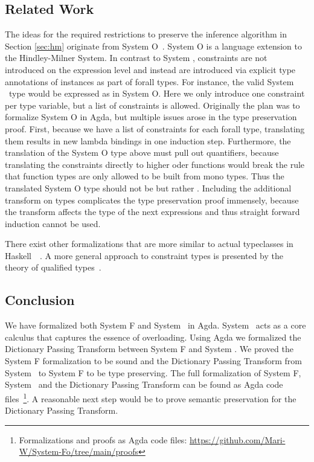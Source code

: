 \subsection{Related Work}
The ideas for the required restrictions to preserve the inference algorithm in Section \ref{sec:hm} originate from System O~\cite{syso}. 
System O is a language extension to the Hindley-Milner System. 
In contrast to System \Fo, constraints are not introduced on the expression level and instead are introduced via explicit type annotations of instances as part of forall types. 
For instance, the valid System \Fo\ type  would be expressed as  in System O. 
Here we only introduce one constraint per type variable, but a list of constraints is allowed. 
Originally the plan was to formalize System O in Agda, but multiple issues arose in the type preservation proof. 
First, because we have a list of  constraints for each forall type, translating them results in  new lambda bindings in one induction step. 
Furthermore, the translation of the System O type above must pull out quantifiers, because translating the constraints directly to higher oder functions would break the rule that function types are only allowed to be built from mono types. 
Thus the translated System O type should not be  but rather . Including the additional transform on types complicates the type preservation proof immensely, because the transform affects the type of the next  expressions and thus straight forward induction cannot be used.

\noindent There exist other formalizations that are more similar to actual typeclasses in Haskell~\cite{ahp}~\cite{tc}. A more general approach to constraint types is presented by the theory of qualified types~\cite{qt}.

\subsection{Conclusion}
We have formalized both System F and System \Fo\ in Agda. 
System \Fo\ acts as a core calculus that captures the essence of overloading.
Using Agda we formalized the Dictionary Passing Transform between System F and System \Fo. 
We proved the System F formalization to be sound and the Dictionary Passing Transform from System \Fo\ to System F to be type preserving. The full formalization of System F, System \Fo\ and the Dictionary Passing Transform can be found as Agda code files~\footnote{Formalizations and proofs as Agda code files: \url{https://github.com/Mari-W/System-Fo/tree/main/proofs}}.
A reasonable next step would be to prove semantic preservation for the Dictionary Passing Transform. 